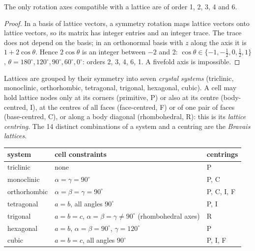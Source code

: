\begin{theorem}\label{thm:b3:x-ray-diffraction:restriction}
The only rotation axes compatible with a lattice are of order 1, 2, 3, 4 and 6.
\end{theorem}

\begin{proof}
In a basis of lattice vectors, a symmetry rotation maps lattice vectors onto
lattice vectors, so its matrix has integer entries and an integer trace. The
trace does not depend on the basis; in an orthonormal basis with $z$ along the
axis it is $1 + 2\cos\theta$. Hence $2\cos\theta$ is an integer between $-2$ and 2:
$\cos\theta \in \{-1, -\frac12, 0, \frac12, 1\}$, $\theta = 180^\circ, 120^\circ, 90^\circ,
60^\circ, 0^\circ$: orders 2, 3, 4, 6, 1. A fivefold axis is impossible.
\end{proof}

\begin{definition}\label{def:b3:x-ray-diffraction:crystal-system}
Lattices are grouped by their symmetry into seven \emph{crystal
systems} (triclinic, monoclinic, orthorhombic, tetragonal,
trigonal, hexagonal, cubic). A cell may hold lattice nodes only at its corners
(primitive, P) or also at its centre (body-centred, I), at the centres of all
faces (face-centred, F) or of one pair of faces (base-centred, C), or along a
body diagonal (rhombohedral, R): this is its \emph{lattice
centring}. The 14 distinct combinations of a system and
a centring are the \emph{Bravais lattices}.
\end{definition}

\begin{center}\small
\begin{tabular}{lll}
\hline
system & cell constraints & centrings \\ \hline
triclinic & none & P \\
monoclinic & $\alpha = \gamma = 90^\circ$ & P, C \\
orthorhombic & $\alpha = \beta = \gamma = 90^\circ$ & P, C, I, F \\
tetragonal & $a = b$, all angles $90^\circ$ & P, I \\
trigonal & $a = b = c$, $\alpha = \beta = \gamma \ne 90^\circ$ (rhombohedral axes) & R \\
hexagonal & $a = b$, $\alpha = \beta = 90^\circ$, $\gamma = 120^\circ$ & P \\
cubic & $a = b = c$, all angles $90^\circ$ & P, I, F \\ \hline
\end{tabular}
\end{center}

